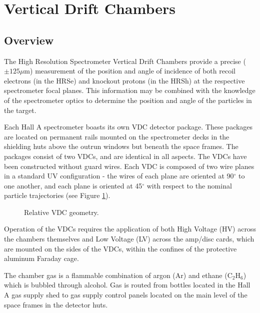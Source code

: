 \documentclass[12pt]{article}
\begin{document}
\section{Vertical Drift Chambers}



\subsection{Overview}

The High Resolution Spectrometer Vertical Drift Chambers provide a
precise ($\pm 125\mu$m) measurement of the position and angle of
incidence of both recoil electrons (in the HRSe) and knockout protons
(in the HRSh) at the respective spectrometer focal planes.  This
information may be combined with the knowledge of the spectrometer
optics to determine the position and angle of the particles in the
target.

Each Hall A spectrometer boasts its own VDC detector package.  These
packages are located on permanent rails mounted on the spectrometer
decks in the shielding huts above the outrun windows but beneath the
space frames.  The packages consist of two VDCs, and are identical
in all aspects.  The VDCs have been constructed without guard wires.
Each VDC is composed of two wire planes in a standard UV
configuration - the wires of each plane are oriented at 90$^\circ$
to one another, and each plane is oriented at 45$^\circ$ with respect
to the nominal particle trajectories (see Figure \ref{trajectory}).

\begin{figure}[H]
\setlength{\epsfxsize}{1.00\textwidth}
\setlength{\epsfysize}{0.70\textwidth}
\leavevmode
{}
\caption{Relative VDC geometry.}
\label{trajectory}
\end{figure}

Operation of the VDCs requires the application of both High Voltage
(HV) across the chambers themselves and Low Voltage (LV) across the
amp/disc cards, which are mounted on the sides of 
the VDCs, within the confines of the protective aluminum Faraday cage.

The chamber gas is a flammable combination of argon (Ar) and ethane
(C$_2$H$_6$) which is bubbled through alcohol.  Gas is routed from
bottles located in the Hall A gas supply shed to gas supply control
panels located on the main level of the space frames in the detector
huts.
\end{document}
